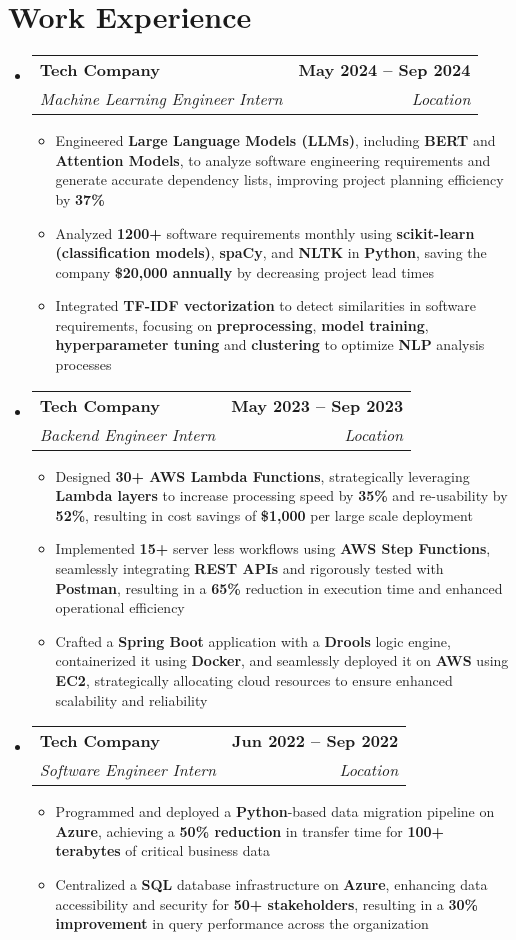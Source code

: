 \documentclass[letterpaper,11pt]{article}
\makeatletter
\newcommand{\resumeItem}[1]{
  \item\small{
    {#1 \vspace{0pt}}
  }
}
\newcommand{\resumeSubheading}[4]{
  \vspace{-2pt}\item
    \begin{tabular*}{1.0\textwidth}[t]{l@{\extracolsep{\fill}}r}
      \textbf{#1} & \textbf{\small #2} \\
      \textit{\small#3} & \textit{\small #4} \\
    \end{tabular*}\vspace{-7pt}
}
\newcommand{\resumeSubHeadingListStart}{\begin{itemize}[leftmargin=0.0in, label={}]}
\newcommand{\resumeSubHeadingListEnd}{\end{itemize}}\vspace{0pt}
\newcommand{\resumeItemListStart}{\begin{itemize}}
\newcommand{\resumeItemListEnd}{\end{itemize}\vspace{-5pt}}
\makeatother
\begin{document}
\section{Work Experience}
    \resumeSubHeadingListStart
                \resumeSubheading{Tech Company}{May 2024 -- Sep 2024}{Machine Learning Engineer Intern}{Location} 
                \resumeItemListStart
                    \resumeItem{Engineered \textbf{Large Language Models (LLMs)}, including \textbf{BERT} and \textbf{Attention Models}, to analyze software engineering requirements and generate accurate dependency lists, improving project planning efficiency by \textbf{37\%}}
                    \resumeItem{Analyzed \textbf{1200+} software requirements monthly using \textbf{scikit-learn (classification models)}, \textbf{spaCy}, and \textbf{NLTK} in \textbf{Python}, saving the company \textbf{\$20,000 annually} by decreasing project lead times}
                    \resumeItem{Integrated \textbf{TF-IDF vectorization} to detect similarities in software requirements, focusing on \textbf{preprocessing}, \textbf{model training}, \textbf{hyperparameter tuning} and \textbf{clustering} to optimize \textbf{NLP} analysis processes}
                    \resumeItemListEnd
            \resumeSubheading{Tech Company}{May 2023 -- Sep 2023}{Backend Engineer Intern}{Location} 
                \resumeItemListStart
                    \resumeItem{Designed \textbf{30+ AWS Lambda Functions}, strategically leveraging \textbf{Lambda layers} to increase processing speed by \textbf{35\%} and re-usability by \textbf{52\%}, resulting in cost savings of \textbf{\$1,000} per large scale deployment}
                    \resumeItem{Implemented \textbf{15+} server less workflows using \textbf{AWS Step Functions}, seamlessly integrating \textbf{REST APIs} and rigorously tested with \textbf{Postman},  resulting in a \textbf{65\%} reduction in execution time and enhanced operational efficiency}
                    \resumeItem{Crafted a \textbf{Spring Boot} application with a \textbf{Drools} logic engine, containerized it using \textbf{Docker}, and seamlessly deployed it on \textbf{AWS} using \textbf{EC2}, strategically allocating cloud resources to ensure enhanced scalability and reliability}
                    \resumeItemListEnd
            \resumeSubheading{Tech Company}{Jun 2022 -- Sep 2022}{Software Engineer Intern}{Location}
                \resumeItemListStart
                    \resumeItem{Programmed and deployed a \textbf{Python}-based data migration pipeline on \textbf{Azure}, achieving a \textbf{50\% reduction} in transfer time for \textbf{100+ terabytes} of critical business data}
                    \resumeItem{Centralized a \textbf{SQL} database infrastructure on \textbf{Azure}, enhancing data accessibility and security for \textbf{50+ stakeholders}, resulting in a \textbf{30\% improvement} in query performance across the organization}
                    \resumeItemListEnd
    \resumeSubHeadingListEnd
    \vspace{-12pt}
\end{document}
